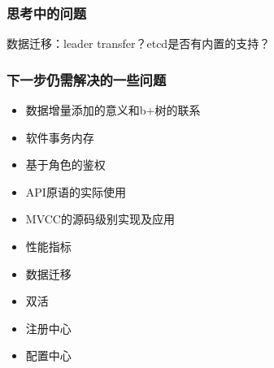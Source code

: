 \documentclass{beamer}
\begin{document}
%
%

\begin{frame}
\frametitle{思考中的问题}
    数据迁移：leader transfer？etcd是否有内置的支持？
\end{frame}


\begin{frame}
\frametitle{下一步仍需解决的一些问题}

\begin{itemize}
    \item 数据增量添加的意义和b+树的联系
    \item 软件事务内存
    \item 基于角色的鉴权
    \item API原语的实际使用
    \item MVCC的源码级别实现及应用
    \item 性能指标
    \item 数据迁移
    \item 双活
    \item 注册中心
    \item 配置中心
\end{itemize}
\end{frame}
\end{document}
